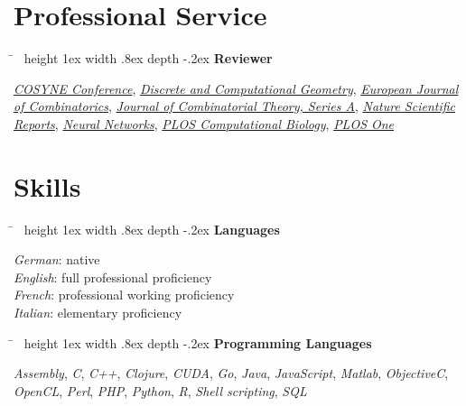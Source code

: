 \documentclass[10pt]{article} %
\newlength{\smallertextwidth}
\newcommand{\sqbullet}{~\vrule height 1ex width .8ex depth -.2ex} %
\newcommand{\skillgroup}[2]{
\begin{tabbing}
\hspace{5mm} \= \kill
\sqbullet \>\+ \textbf{#1}\\
\begin{minipage}{\smallertextwidth}
\vspace{2mm}
#2
\end{minipage}
\end{tabbing}
}
\begin{document}

\section{Professional Service}

\skillgroup{Reviewer}
{
\textit{\href{http://www.cosyne.org}{COSYNE Conference}},
\textit{\href{https://link.springer.com/journal/454}{Discrete and Computational Geometry}},
\textit{\href{https://www.journals.elsevier.com/european-journal-of-combinatorics}{European Journal of Combinatorics}},
\textit{\href{https://www.journals.elsevier.com/journal-of-combinatorial-theory-series-a}{Journal of Combinatorial Theory, Series A}},
\textit{\href{https://www.nature.com/srep/}{Nature Scientific Reports}},
\textit{\href{https://www.journals.elsevier.com/neural-networks}{Neural Networks}},
\textit{\href{https://journals.plos.org/ploscompbiol/}{PLOS Computational Biology}},
\textit{\href{https://journals.plos.org/plosone/}{PLOS One}}
}



\section{Skills}

\skillgroup{Languages}
{
  \textit{German}: native\\
  \textit{English}: full professional proficiency\\
  \textit{French}: professional working proficiency\\
  \textit{Italian}: elementary proficiency\\
}



\skillgroup{Programming Languages}
{
\textit{Assembly}, \textit{C}, \textit{C++},
\textit{Clojure},
\textit{CUDA},
\textit{Go},
\textit{Java},
\textit{JavaScript},
\textit{Matlab},
\textit{ObjectiveC},
\textit{OpenCL},
\textit{Perl},
\textit{PHP},
\textit{Python},
\textit{R},
\textit{Shell scripting},
\textit{SQL}
}
\end{document}

